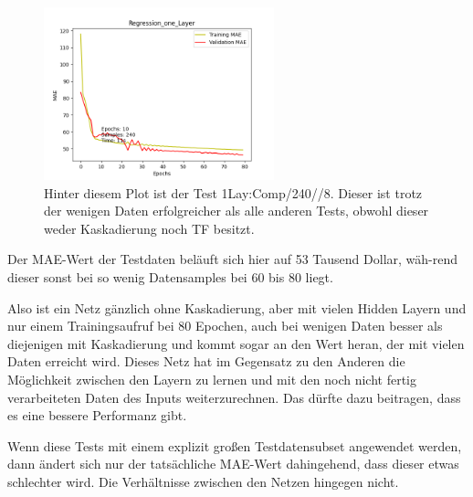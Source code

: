 \begin{figure}
    \centering
    \includegraphics[height=5cm]{../../Plots/ba_plots/regression_small/onelayer_complete.png}
    \caption{\label{fig:smallonlcomp} 
    \small{Hinter diesem Plot ist der Test 1Lay:Comp/240//8. Dieser ist trotz der wenigen Daten erfolgreicher 
    als alle anderen Tests, obwohl dieser weder Kaskadierung noch TF besitzt.}}
\end{figure}

Der MAE-Wert der Testdaten beläuft sich hier auf 53 Tausend Dollar, wäh-rend dieser sonst bei so wenig Datensamples bei 60 bis 80 liegt. 

Also ist ein Netz gänzlich ohne Kaskadierung, aber mit vielen Hidden Layern und nur einem Trainingsaufruf bei 80 Epochen, auch bei wenigen 
Daten besser als diejenigen mit Kaskadierung und kommt sogar an den Wert heran, der mit vielen Daten erreicht wird. 
Dieses Netz hat im Gegensatz zu den Anderen die Möglichkeit zwischen den Layern zu lernen und mit den noch nicht fertig verarbeiteten Daten 
des Inputs weiterzurechnen. Das dürfte dazu beitragen, dass es eine bessere Performanz gibt. 

Wenn diese Tests mit einem explizit großen Testdatensubset angewendet werden, dann ändert sich nur der tatsächliche MAE-Wert dahingehend, dass 
dieser etwas schlechter wird. Die Verhältnisse zwischen den Netzen hingegen nicht. 

